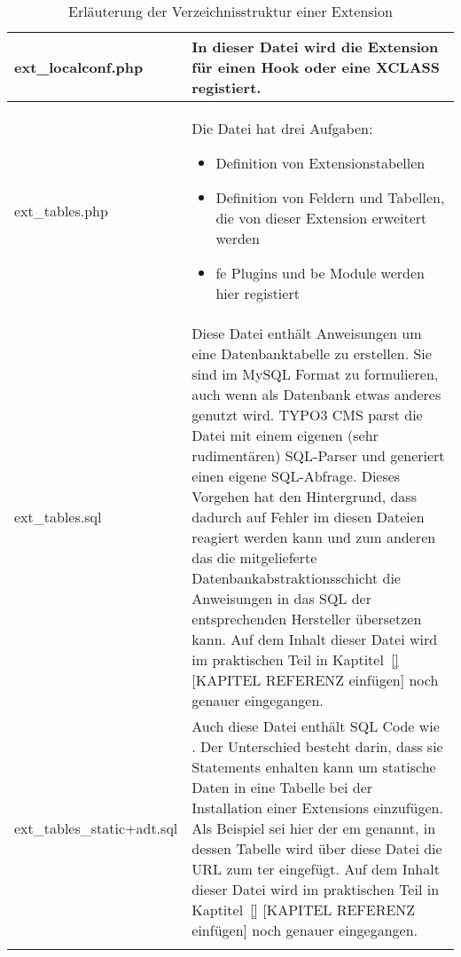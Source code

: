 \begin{longtable}{|l|p{}|}
	ext\_localconf.php & In dieser Datei wird die Extension für einen Hook oder eine XCLASS registiert.\\ \hline
	ext\_tables.php & Die Datei hat drei Aufgaben:
	\begin{itemize}
	\item Definition von Extensionstabellen
	\item Definition von Feldern und Tabellen, die von dieser Extension erweitert werden
	\item \gls{fe} Plugins und \gls{be} Module werden hier registiert
	\end{itemize}
	\\ \hline
	ext\_tables.sql & Diese Datei enthält Anweisungen um eine Datenbanktabelle zu erstellen. Sie sind im MySQL Format zu formulieren, auch wenn als Datenbank etwas anderes genutzt wird. TYPO3 CMS parst die Datei mit einem eigenen (sehr rudimentären) SQL-Parser und generiert einen eigene SQL-Abfrage. Dieses Vorgehen hat den Hintergrund, dass dadurch auf Fehler im diesen Dateien reagiert werden kann und zum anderen das die mitgelieferte Datenbankabstraktionsschicht die Anweisungen in das SQL der entsprechenden Hersteller übersetzen kann. Auf dem Inhalt dieser Datei wird im praktischen Teil in Kaptitel~\ref{} [KAPITEL REFERENZ einfügen] noch genauer eingegangen.\\ \hline
	ext\_tables\_static+adt.sql & Auch diese Datei enthält SQL Code wie \pdf{ext\_tables.sql}. Der Unterschied besteht darin, dass sie \pdf{INSERT} Statements enhalten kann um statische Daten in eine Tabelle bei der Installation einer Extensions einzufügen. Als Beispiel sei hier der \gls{em} genannt, in dessen Tabelle wird über diese Datei die URL zum \gls{ter} eingefügt. Auf dem Inhalt dieser Datei wird im praktischen Teil in Kaptitel~\ref{} [KAPITEL REFERENZ einfügen] noch genauer eingegangen.\\ \hline
	\caption{Erläuterung der Verzeichnisstruktur einer Extension}
	\label{tab:extensionFolderStructure}
\end{longtable}
